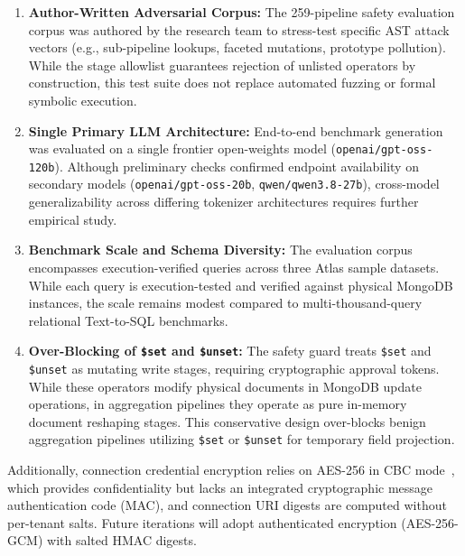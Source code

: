 \begin{enumerate}
    \item \textbf{Author-Written Adversarial Corpus:} The 259-pipeline safety evaluation corpus was authored by the research team to stress-test specific AST attack vectors (e.g., sub-pipeline lookups, faceted mutations, prototype pollution). While the stage allowlist guarantees rejection of unlisted operators by construction, this test suite does not replace automated fuzzing or formal symbolic execution.
    
    \item \textbf{Single Primary LLM Architecture:} End-to-end benchmark generation was evaluated on a single frontier open-weights model (\texttt{openai/gpt-oss-120b}). Although preliminary checks confirmed endpoint availability on secondary models (\texttt{openai/gpt-oss-20b}, \texttt{qwen/qwen3.8-27b}), cross-model generalizability across differing tokenizer architectures requires further empirical study.
    
    \item \textbf{Benchmark Scale and Schema Diversity:} The evaluation corpus encompasses \numTotalQueries{} execution-verified queries across three Atlas sample datasets. While each query is execution-tested and verified against physical MongoDB instances, the scale remains modest compared to multi-thousand-query relational Text-to-SQL benchmarks.
    
    \item \textbf{Over-Blocking of \texttt{\$set} and \texttt{\$unset}:} The safety guard treats \texttt{\$set} and \texttt{\$unset} as mutating write stages, requiring cryptographic approval tokens. While these operators modify physical documents in MongoDB update operations, in aggregation pipelines they operate as pure in-memory document reshaping stages. This conservative design over-blocks benign aggregation pipelines utilizing \texttt{\$set} or \texttt{\$unset} for temporary field projection.
\end{enumerate}

Additionally, connection credential encryption relies on AES-256 in CBC mode~\cite{nist80038a}, which provides confidentiality but lacks an integrated cryptographic message authentication code (MAC), and connection URI digests are computed without per-tenant salts. Future iterations will adopt authenticated encryption (AES-256-GCM) with salted HMAC digests.

